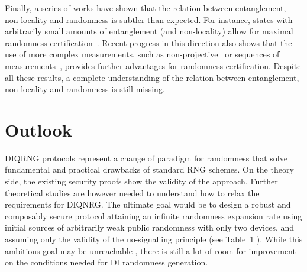 \documentclass[11pt,a4paper]{article}
\begin{document}
{Finally, a series of works have shown that the relation between entanglement, non-locality and randomness is
subtler than expected.
For instance, states with arbitrarily
small amounts of entanglement (and non-locality) allow for maximal randomness certification~\cite{AMP}. %
Recent progress in this direction also shows that the use of more complex measurements, such as non-projective~\cite{witteketal}
or sequences of measurements~\cite{curchodetal}, provides further advantages for randomness certification.
Despite all these results, a complete understanding of the relation between entanglement, non-locality and randomness is still missing. %

\section{Outlook}
\label{outlook}

DIQRNG protocols represent a change of paradigm for randomness that solve fundamental and practical drawbacks of standard RNG schemes. On the theory side, the existing security proofs show the validity of the approach. Further theoretical studies are however needed to understand how to relax the requirements for DIQNRG. The ultimate goal would be to design a robust and composably secure protocol attaining an infinite randomness expansion rate using initial sources of arbitrarily weak public randomness with only two devices, and assuming only the validity of the no-signalling principle (see Table~1%
). While this ambitious goal may be unreachable%
, there is still a lot of room for improvement on the conditions needed for DI randomness generation.

}
\end{document}
